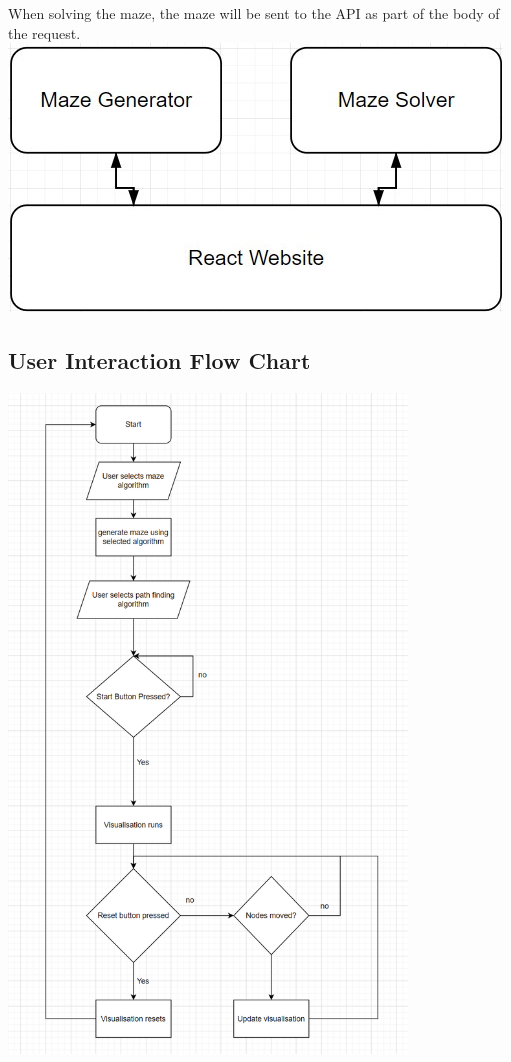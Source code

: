 \documentclass[titlepage]{article}
\begin{document}
When solving the maze, the maze will be sent to the API as part of the body of the request.
\newline
\includegraphics[width=\linewidth]{assets/structure.jpg}
\subsection{User Interaction Flow Chart}
\includegraphics[width=\linewidth, height=17.5cm]{assets/flow chart.PNG}
\end{document}
